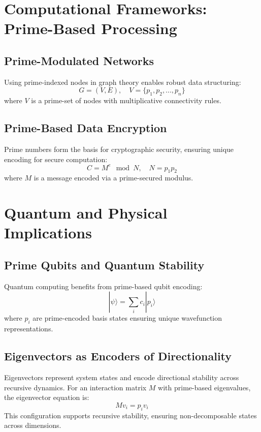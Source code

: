 \documentclass{article}
\begin{document}
\section{Computational Frameworks: Prime-Based Processing}
\subsection{Prime-Modulated Networks}
Using prime-indexed nodes in graph theory enables robust data structuring:
\begin{equation}
    G = (V, E), \quad V = \{ p_1, p_2, ..., p_n \}
\end{equation}
where \( V \) is a prime-set of nodes with multiplicative connectivity rules.

\subsection{Prime-Based Data Encryption}
Prime numbers form the basis for cryptographic security, ensuring unique encoding for secure computation:
\begin{equation}
    C = M^e \mod N, \quad N = p_1 p_2
\end{equation}
where \( M \) is a message encoded via a prime-secured modulus.

\section{Quantum and Physical Implications}
\subsection{Prime Qubits and Quantum Stability}
Quantum computing benefits from prime-based qubit encoding:
\begin{equation}
    | \psi \rangle = \sum_{i} c_i | p_i \rangle
\end{equation}
where \( p_i \) are prime-encoded basis states ensuring unique wavefunction representations.

\subsection{Eigenvectors as Encoders of Directionality}
Eigenvectors represent system states and encode directional stability across recursive dynamics. For an interaction matrix \( M \) with prime-based eigenvalues, the eigenvector equation is:
\begin{equation}
    Mv_i = p_i v_i
\end{equation}
This configuration supports recursive stability, ensuring non-decomposable states across dimensions.
\end{document}
